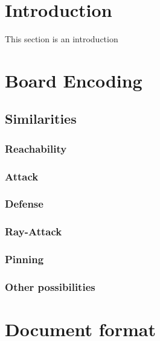 \documentclass[11pt]{article}
\begin{document}
    \section{Introduction}

    This section is an introduction ~\cite{SimilarChessPositions}


    \section{Board Encoding}

    \subsection{Similarities}

    \subsubsection{Reachability}


    \subsubsection{Attack}

    \subsubsection{Defense}

    \subsubsection{Ray-Attack}

    \subsubsection{Pinning}

    \subsubsection{Other possibilities}


    \section{Document format}

\end{document}
